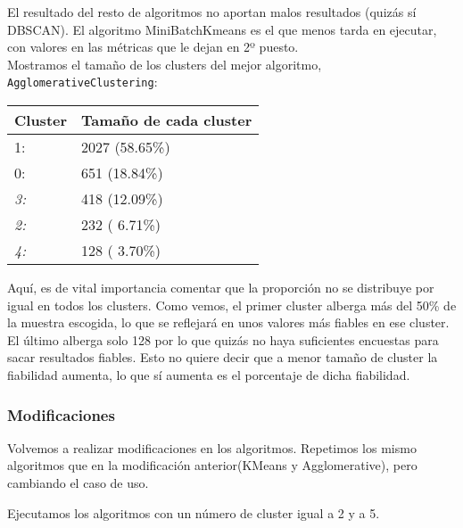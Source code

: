 	El resultado del resto de algoritmos no aportan malos resultados (quizás sí DBSCAN). 
	El algoritmo MiniBatchKmeans es el que menos tarda en ejecutar, con valores en las métricas que le dejan en 2º puesto. \\

	Mostramos el tamaño de los clusters del mejor algoritmo, \texttt{AgglomerativeClustering}:
	
	\begin{table}[H]
				\centering
			\begin{tabular}{|l|l|}
				\hline
				\textbf{Cluster} & \textbf{Tamaño de cada cluster} \\ \hline
				1:               & 2027 (58.65\%)                  \\ \hline
				0:               & 651 (18.84\%)                   \\ \hline
				\textit{3:}      & 418 (12.09\%)                   \\ \hline
				\textit{2:}      & 232 ( 6.71\%)                   \\ \hline
				\textit{4:}      & 128 ( 3.70\%)                   \\ \hline
			\end{tabular}%
		
	\end{table}

	Aquí, es de vital importancia comentar que la proporción no se distribuye por igual en todos los clusters. Como vemos, el primer cluster alberga más del 50\% de la muestra escogida, lo que se reflejará en unos valores más fiables en ese cluster. El último alberga solo 128 por lo que quizás no haya suficientes encuestas para sacar resultados fiables. Esto no quiere decir que a menor tamaño de cluster la fiabilidad aumenta, lo que sí aumenta es el porcentaje de dicha fiabilidad.






	


\subsubsection{Modificaciones}

Volvemos a realizar modificaciones en los algoritmos. Repetimos los mismo algoritmos que en la modificación anterior(KMeans y Agglomerative), pero cambiando el caso de uso.

Ejecutamos los algoritmos con un número de cluster igual a 2 y a 5.

